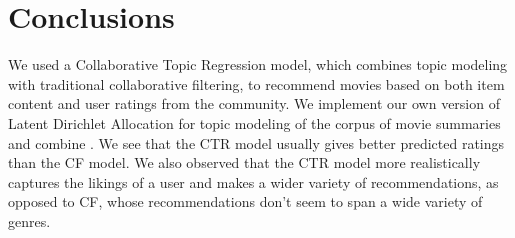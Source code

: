 \documentclass{article} %
\begin{document}
\section{Conclusions}
We used a Collaborative Topic Regression model, which combines topic modeling
with traditional collaborative filtering, to recommend movies based on both
item content and user ratings from the community. We implement our own version
of Latent Dirichlet Allocation for topic modeling of the corpus of movie
summaries and combine . We see that the CTR model usually gives better predicted ratings than the CF model. We also observed that the CTR model more realistically captures the likings of a user and makes a wider variety of recommendations, as opposed to CF, whose recommendations don't seem to span a wide variety of genres.   


\end{document}
